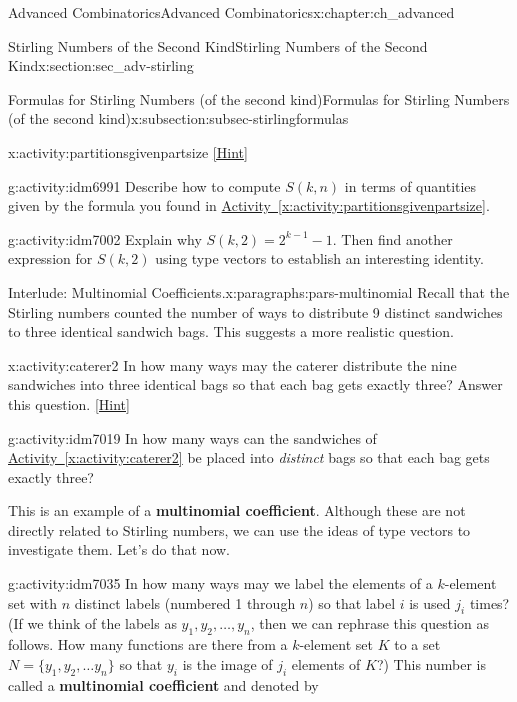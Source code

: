 \documentclass[oneside,10pt,]{book}
\newcommand{\terminology}[1]{\textbf{#1}}
\numberwithin{equation}{chapter}
\begin{document}
\begin{chapterptx}{Advanced Combinatorics}{}{Advanced Combinatorics}{}{}{x:chapter:ch_advanced}
\begin{sectionptx}{Stirling Numbers of the Second Kind}{}{Stirling Numbers of the Second Kind}{}{}{x:section:sec_adv-stirling}
\begin{subsectionptx}{Formulas for Stirling Numbers (of the second kind)}{}{Formulas for Stirling Numbers (of the second kind)}{}{}{x:subsection:subsec-stirlingformulas}
\begin{activity}{}{x:activity:partitionsgivenpartsize}
\space\hspace*{0pt}\hfill{\tiny\hyperlink{g:hint:idm6973-back}{[Hint]}}\end{activity}
\begin{activity}{}{g:activity:idm6991}%
Describe how to compute \(S(k,n)\) in terms of quantities given by the formula you found in \hyperref[x:activity:partitionsgivenpartsize]{Activity~\ref{x:activity:partitionsgivenpartsize}}.%
\end{activity}
\begin{activity}{}{g:activity:idm7002}%
Explain why \(S(k, 2) = 2^{k-1} - 1\).  Then find another expression for \(S(k,2)\) using type vectors to establish an interesting identity.%
\end{activity}
\begin{paragraphs}{Interlude: Multinomial Coefficients.}{x:paragraphs:pars-multinomial}%
Recall that the Stirling numbers counted the number of ways to distribute 9 distinct sandwiches to three identical sandwich bags.  This suggests a more realistic question.%
\begin{activity}{}{x:activity:caterer2}%
In how many ways may the caterer distribute the nine sandwiches into three identical bags so that each bag gets exactly three? Answer this question.%
\space\hspace*{0pt}\hfill{\tiny\hyperlink{g:hint:idm7013-back}{[Hint]}}\end{activity}
\begin{activity}{}{g:activity:idm7019}%
In how many ways can the sandwiches of \hyperref[x:activity:caterer2]{Activity~\ref{x:activity:caterer2}} be placed into \emph{distinct} bags so that each bag gets exactly three?%
\end{activity}
This is an example of a \terminology{multinomial coefficient}.  Although these are not directly related to Stirling numbers, we can use the ideas of type vectors to investigate them.  Let's do that now.%
\begin{activity}{}{g:activity:idm7035}%
In how many ways may we label the elements of a \(k\)-element set with \(n\) distinct labels (numbered 1 through \(n\)) so that label \(i\) is used \(j_i\) times? (If we think of the labels as \(y_1, y_2, \ldots, y_n\), then we can rephrase this question as follows.  How many functions are there from a \(k\)-element set \(K\) to a set \(N=\{y_1,y_2,\ldots y_n\}\) so that \(y_i\) is the image of \(j_i\) elements of \(K\)?) This number is called a \terminology{multinomial coefficient} and denoted by%

\end{activity}
\end{paragraphs}
\end{subsectionptx}
\end{sectionptx}
\end{chapterptx}
\end{document}
